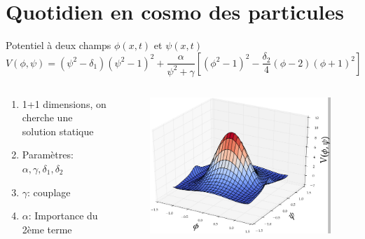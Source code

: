 \documentclass[handout]{beamer}
\begin{document}
\section{Quotidien en cosmo des particules}
\begin{frame}
\begin{block}{Potentiel à deux champs $\phi(x,t)$ et $\psi(x,t)$}
\begin{equation*}
V(\phi,\psi)=(\psi^2-\delta_1)(\psi^2-1)^2+\frac{\alpha}{\psi^2+\gamma}[(\phi^2-1)^2 - \frac{\delta_2}{4}(\phi-2)(\phi+1)^2] 
\end{equation*}

\end{block}
\begin{columns}[T]
    \begin{column}[T]{.5\linewidth}
  
\begin{enumerate}
\item 1+1 dimensions, on cherche une solution statique
\item Paramètres: $\alpha, \gamma, \delta_1, \delta_2$
\item $\gamma$: couplage
\item $\alpha$: Importance du 2ème terme 
\end{enumerate}  
    \end{column}
    \begin{column}[T]{.5\linewidth}
    \begin{figure}[0.3\textwidth]
    \includegraphics[scale=0.2]{potypot.png}
    \end{figure}
    \end{column}
  \end{columns}
\end{frame}
\end{document}

